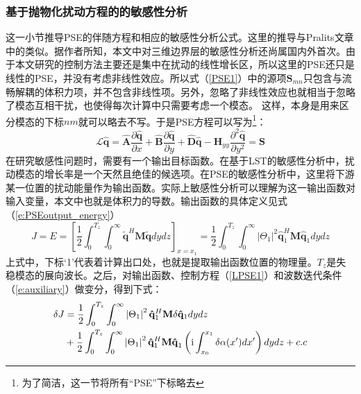 \subsubsection{基于抛物化扰动方程的的敏感性分析}
这一小节推导PSE的伴随方程和相应的敏感性分析公式。这里的推导与Pralits\cite{pralits2000sensitivity}文章中的类似。据作者所知，本文中对三维边界层的敏感性分析还尚属国内外首次。由于本文研究的控制方法主要还是集中在扰动的线性增长区，所以这里的PSE还只是线性的PSE，并没有考虑非线性效应。所以式（\ref{PSE1}）中的源项${\mathbf{S}}_{mn}$只包含与流畅解耦的体积力项，并不包含非线性项。另外，忽略了非线性效应也就相当于忽略了模态互相干扰，也使得每次计算中只需要考虑一个模态。 这样，本身是用来区分模态的下标$nm$就可以略去不写。于是PSE方程可以写为\footnote{为了简洁，这一节将所有“PSE”下标略去}：
\begin{equation}
\label{LPSE1}
    \mathscr{L}{\mathbf{\hat q}}  = {\mathbf{\hat A}}\frac{{\partial {\mathbf{\hat q}} }}
    {{\partial x}} + {\mathbf{\hat B}}\frac{{\partial {\mathbf{\hat q}} }}
    {{\partial y}} + {\mathbf{\hat D\hat q}}  - {\mathbf{H}}_{yy} \frac{{\partial ^2 {\mathbf{\hat q}} }}
    {{\partial y^2 }} = {\mathbf{S}}
\end{equation}
在研究敏感性问题时，需要有一个输出目标函数。在基于LST的敏感性分析中，扰动模态的增长率是一个天然且绝佳的候选项。在PSE的敏感性分析中，这里将下游某一位置的扰动能量作为输出函数。实际上敏感性分析可以理解为这一输出函数对输入变量，本文中也就是体积力的导数。输出函数的具体定义见式（\ref{e:PSEoutput_energy}）
\begin{equation}
\label{e:PSEoutput_energy}
J = E = \left[ {\frac{1}
{2}\int_0^{T_z } {\int_0^\infty  {{\mathbf{\tilde q}}^H {\mathbf{M\tilde q}}dydz} } } \right]_{x = x_1 }  %
= \frac{1}
{2}\int_0^{T_z } {\int_0^\infty  {\left| {\Theta _1 } \right|^2 {\mathbf{\hat q}}_1 ^H {\mathbf{M\hat q}}_1 dydz} }
\end{equation}
上式中，下标`1'代表着计算出口处，也就是提取输出函数位置的物理量。$T_z$是失稳模态的展向波长。之后，对输出函数、控制方程（\ref{LPSE1}）和波数迭代条件（\ref{e:auxiliary}）做变分，得到下式：
\begin{equation}\label{e:bianfenJ}
\begin{aligned}
\delta J & = \frac{1}
{2}\int_0^{T_z } {\int_0^\infty  {\left| {\Theta _1 } \right|^2 {\mathbf{\hat q}}_1 ^H {\mathbf{M}}\delta {\mathbf{\hat q}}_1 dydz} }  \\
         &+ \frac{1}{2}\int_0^{T_z } {\int_0^\infty  {\left| {\Theta _1 } \right|^2 {\mathbf{\hat q}}_1 ^H {\mathbf{M\hat q}}_1 \left( {{\rm i}\int_{x_0 }^{x_1 } {\delta \alpha (x')dx'} } \right)dydz} }  + c.c \\
\end{aligned}
\end{equation}
